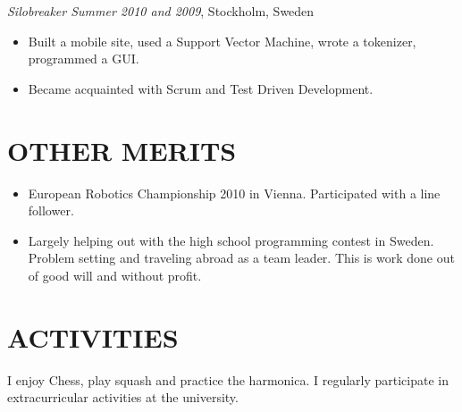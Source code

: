 \documentclass[11pt]{res} %
\begin{document}
\begin{resume}
\emph{Silobreaker Summer 2010 and 2009}, Stockholm, Sweden
\vspace{0.2in}
 \begin{itemize} %
  \item Built a mobile site, used a Support Vector Machine, wrote a tokenizer,
   programmed a GUI.
  \item Became acquainted with Scrum and Test Driven Development.
\end{itemize} 

\section{OTHER MERITS}

   \begin{itemize} %
   \item European Robotics Championship 2010 in Vienna.
    Participated with a line follower.
   \item Largely helping out with the high school programming contest in Sweden.
    Problem setting and traveling abroad as a team leader.
    This is work done out of good will and without profit.
 \end{itemize}

\section{ACTIVITIES} 
 
I enjoy Chess, play squash and practice the harmonica.
I regularly participate in extracurricular
activities at the university.
 

\end{resume}
\end{document}
